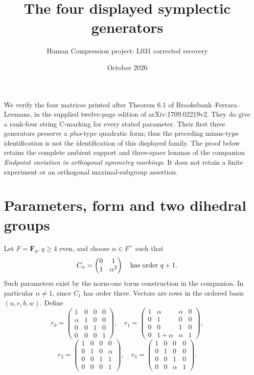 \documentclass[11pt,a4paper]{article}
\title{The four displayed symplectic generators}
\author{Human Compression project: L031 corrected recovery}
\date{October 2026}
\newcommand{\F}{\mathbf F}
\begin{document}
\maketitle
We verify the four matrices printed after Theorem 6.1 of
Brooksbank--Ferrara--Leemans, in the supplied twelve-page edition
of arXiv:1709.02219v2. They do give a rank-four string C-marking
for every stated parameter. Their first three generators preserve
a \emph{plus}-type quadratic form; thus the preceding minus-type
identification is not the identification of this displayed family.
The proof below retains the complete ambient support and three-space
lemmas of the companion \emph{Endpoint variation in orthogonal
symmetry markings}. It does not retain a finite experiment or an
orthogonal maximal-subgroup assertion.

\section{Parameters, form and two dihedral groups}
Let $F=\F_q$, $q\geq4$ even, and choose $\alpha\in F^\times$ such that
\[
 C_\alpha=\begin{pmatrix}0&1\\1&\alpha^2\end{pmatrix}
 \quad\hbox{has order }q+1.
\]
Such parameters exist by the norm-one torus construction in the
companion. In particular $\alpha\ne1$, since $C_1$ has order three.
Vectors are rows in the ordered basis $(u,e,b,w)$. Define
\[
 r_0=\begin{pmatrix}1&0&0&0\\\alpha&1&0&0\\0&0&1&0\\0&0&0&1\end{pmatrix},
 \quad r_1=\begin{pmatrix}1&\alpha&\alpha&0\\0&1&0&0\\0&0&1&0\\0&1+\alpha&\alpha&1\end{pmatrix},
\]
\[
 r_2=\begin{pmatrix}1&0&0&0\\0&1&0&\alpha\\0&0&1&1\\0&0&0&1\end{pmatrix},
 \quad r_3=\begin{pmatrix}1&0&0&0\\0&1&0&0\\0&0&1&0\\0&0&\alpha&1\end{pmatrix}.
                                                               \tag{1}
\]
\end{document}
